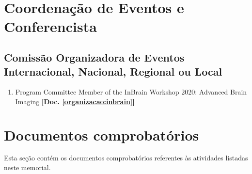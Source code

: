 \documentclass[a4paper,oneside,10pt]{article}
\newcounter{document}%
\begin{document}
\section{Coordenação de Eventos e Conferencista}
\vspace{0.3cm}


\subsection{Comiss\~{a}o Organizadora de Eventos Internacional, Nacional, Regional ou Local}
\vspace{0.3cm}

\begin{enumerate}
\renewcommand{\labelenumi}{{\large\bfseries\arabic{enumi}.}}

    \item Program Committee Member of the InBrain Workshop 2020: Advanced Brain Imaging \textbf{[Doc. \ref{organizacao:inbrain}]}
    
\end{enumerate}


\clearpage
\appendix
\newpage
\section{Documentos comprobatórios}
Esta seção contém os documentos comprobatórios referentes às atividades listadas neste memorial.
\renewcommand{\thesubsection}{\arabic{subsection}}


\end{document}
